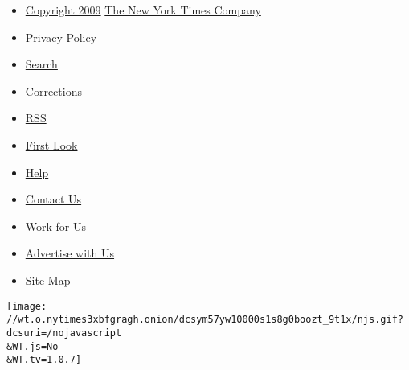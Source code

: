 \begin{itemize}
\tightlist
\item
  \href{//www.nytimes3xbfgragh.onion/ref/membercenter/help/copyright.html}{Copyright
  2009} \href{//www.nytco.com/}{The New York Times Company}
\item
  \href{//www.nytimes3xbfgragh.onion/privacy}{Privacy Policy}
\item
  \href{//www.nytimes3xbfgragh.onion/search}{Search}
\item
  \href{//www.nytimes3xbfgragh.onion/corrections.html}{Corrections}
\item
  \href{//www.nytimes3xbfgragh.onion/rss}{RSS}
\item
  \href{//firstlook.nytimes3xbfgragh.onion}{First Look}
\item
  \href{//www.nytimes3xbfgragh.onion/membercenter/sitehelp.html}{Help}
\item
  \href{//www.nytimes3xbfgragh.onion/ref/membercenter/help/infoservdirectory.html}{Contact
  Us}
\item
  \href{//www.nytco.com/careers}{Work for Us}
\item
  \href{//www.nytimes.whsites.net/mediakit/}{Advertise with Us}
\item
  \href{//spiderbites.nytimes3xbfgragh.onion/}{Site Map}
\end{itemize}

\texttt{[image: //wt.o.nytimes3xbfgragh.onion/dcsym57yw10000s1s8g0boozt\_9t1x/njs.gif?dcsuri=/nojavascript\\\&WT.js=No\\\&WT.tv=1.0.7]}
